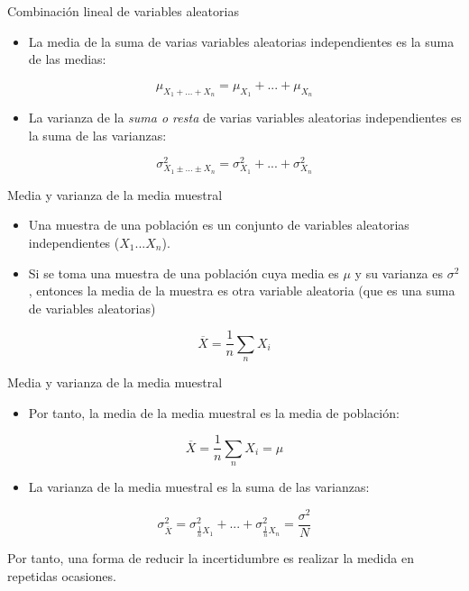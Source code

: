 \documentclass[xcolor={usenames,svgnames,dvipsnames}]{beamer}
\begin{document}
\begin{frame}[label={sec:org50e7862}]{Combinación lineal de variables aleatorias}
\begin{itemize}
\item La \alert{media de la suma} de varias variables aleatorias \alert{independientes} es
la suma de las medias:
\end{itemize}
\[
\mu_{X_{1}+...+X_{n}}=\mu_{X_{1}}+...+\mu_{X_{n}}
\]

\begin{itemize}
\item La \alert{varianza de la \emph{suma o resta}} de varias variables aleatorias
\alert{independientes} es la \alert{suma} de las varianzas:
\end{itemize}

\[
\sigma_{X_{1}\pm...\pm X_{n}}^{2}=\sigma_{X_{1}}^{2}+...+\sigma_{X_{n}}^{2}
\]
\end{frame}



\begin{frame}[label={sec:org33f2e71}]{Media y varianza de la media muestral}
\begin{itemize}
\item Una \alert{muestra de una población} es un conjunto de variables
aleatorias independientes (\(X_{1}...X_{n}\)).

\item Si se toma una muestra de una población cuya media es \(\mu\) y su
varianza es \(\sigma^{2}\), entonces la media de la muestra es otra
variable aleatoria (que es una suma de variables aleatorias)
\end{itemize}

\[
\overline{X}=\frac{1}{n}\sum_{n}X_{i}
\]
\end{frame}



\begin{frame}[label={sec:org0fefbab}]{Media y varianza de la media muestral}
\begin{itemize}
\item Por tanto, la \alert{media de la media muestral} es la media de población:
\end{itemize}
\[
\overline{X}=\frac{1}{n}\sum_{n}X_{i} = \mu
\]

\begin{itemize}
\item La \alert{varianza de la media muestral} es la suma de las varianzas:
\end{itemize}

\[
\sigma_{\overline{X}}^{2}=\sigma_{\frac{1}{n}X_{1}}^{2}+...+\sigma_{\frac{1}{n}X_{n}}^{2}=\frac{\sigma^2}{N}
\]

\begin{block}{}
Por tanto, una forma de \alert{reducir la incertidumbre} es realizar la
\alert{medida en repetidas ocasiones}.
\end{block}
\end{frame}
\end{document}
